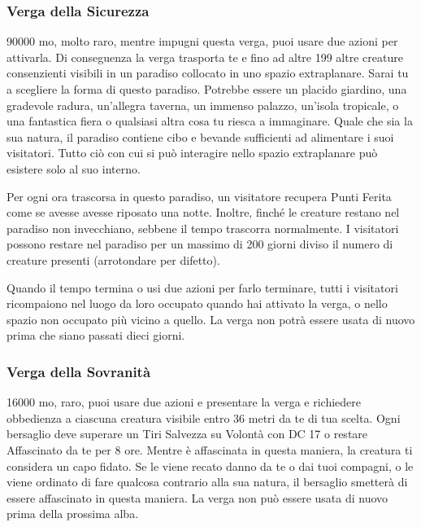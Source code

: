 \begin{multicols}{2}
	\subsubsection*{Verga della Sicurezza}
	90000 mo, molto raro, mentre impugni questa verga, puoi usare due azioni per attivarla. Di conseguenza la verga trasporta te e fino ad altre 199 altre creature consenzienti visibili in un paradiso collocato in uno spazio extraplanare. Sarai tu a scegliere la forma di questo paradiso. Potrebbe essere un placido giardino, una gradevole radura, un'allegra taverna, un immenso palazzo, un'isola tropicale, o una fantastica fiera o qualsiasi altra cosa tu riesca a immaginare. Quale che sia la sua natura, il paradiso contiene cibo e bevande sufficienti ad alimentare i suoi visitatori. Tutto ciò con cui si può interagire nello spazio extraplanare può esistere solo al suo interno.

	Per ogni ora trascorsa in questo paradiso, un visitatore recupera Punti Ferita come se avesse avesse riposato una notte. Inoltre, finché le creature restano nel paradiso non invecchiano, sebbene il tempo trascorra normalmente. I visitatori possono restare nel paradiso per un massimo di 200 giorni diviso il numero di creature presenti (arrotondare per difetto).

	Quando il tempo termina o usi due azioni per farlo terminare, tutti i visitatori ricompaiono nel luogo da loro occupato quando hai attivato la verga, o nello spazio non occupato più vicino a quello. La verga non potrà essere usata di nuovo prima che siano passati dieci giorni.

	\subsubsection*{Verga della Sovranità}
	16000 mo, raro, puoi usare due azioni e presentare la verga e richiedere obbedienza a ciascuna creatura visibile entro 36 metri da te di tua scelta. Ogni bersaglio deve superare un Tiri Salvezza su Volontà con DC 17 o restare Affascinato da te per 8 ore. Mentre è affascinata in questa maniera, la creatura ti considera un capo fidato. Se le viene recato danno da te o dai tuoi compagni, o le viene ordinato di fare qualcosa contrario alla sua natura, il bersaglio smetterà di essere affascinato in questa maniera. La verga non può essere usata di nuovo prima della prossima alba.


\end{multicols}
